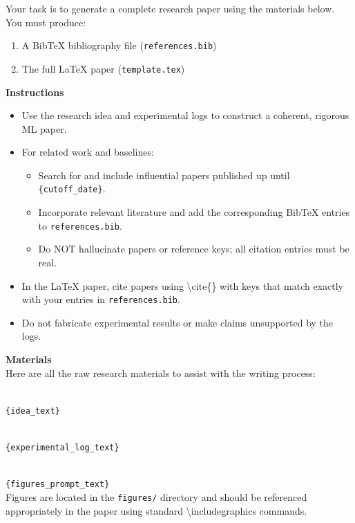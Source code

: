 \noindent Your task is to generate a complete research paper using the materials below. You must produce:
\begin{enumerate}
    \item A BibTeX bibliography file (\texttt{references.bib})
    \item The full LaTeX paper (\texttt{template.tex})
\end{enumerate}

\vspace{1em}
\noindent\textbf{Instructions}
\begin{itemize}
    \item Use the research idea and experimental logs to construct a coherent, rigorous ML paper.
    \item For related work and baselines:
    \begin{itemize}
        \item Search for and include influential papers published up until \texttt{\{cutoff\_date\}}.
        \item Incorporate relevant literature and add the corresponding BibTeX entries to \texttt{references.bib}.
        \item Do NOT hallucinate papers or reference keys; all citation entries must be real.
    \end{itemize}
    \item In the LaTeX paper, cite papers using \textbackslash{}cite\{\} with keys that match exactly with your entries in \texttt{references.bib}.
    \item Do not fabricate experimental results or make claims unsupported by the logs.
\end{itemize}

\vspace{1em}
\noindent\textbf{Materials}\\
\vspace{0.5em}
Here are all the raw research materials to assist with the writing process:

\vspace{0.5em}
\\
\texttt{\{idea\_text\}}

\vspace{0.5em}
\\
\texttt{\{experimental\_log\_text\}}

\vspace{0.5em}
\\
\texttt{\{figures\_prompt\_text\}}\\
Figures are located in the \texttt{figures/} directory and should be referenced appropriately in the paper using standard \textbackslash{}includegraphics commands.

